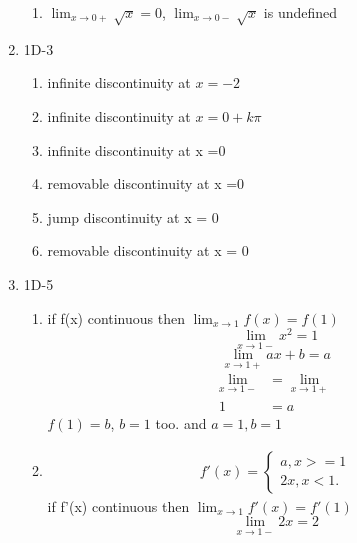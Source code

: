 \documentclass{article}
\begin{document}
\begin{enumerate}
    \begin{enumerate}
        \item 
            $\lim_{x \to 0+} \sqrt{x} = 0$, $\lim_{x \to 0-} \sqrt{x}$ is undefined
    \end{enumerate}
\item 1D-3
    \begin{enumerate}
        \item infinite discontinuity at $x = -2$
        \item infinite discontinuity at $x = 0 + k\pi$
        \item infinite discontinuity at x =0
        \item removable discontinuity at x =0
        \item jump discontinuity at x = 0 
        \item removable discontinuity at x = 0
    \end{enumerate}
\item 1D-5
    \begin{enumerate}
        \item 
            if f(x) continuous then $\lim_{x \to 1} f(x) = f(1)$
            \begin{equation*}
                \lim_{x \to 1-} x^2 = 1
            \end{equation*}
            \begin{equation*}
                \lim_{x \to 1+} ax+b = a
            \end{equation*}
            \begin{align*}
                \lim_{x \to 1-} &= \lim_{x \to 1+} \\
                 1 &= a
            \end{align*}
            $f(1) = b$, $b = 1$ too. and
            $a = 1, b = 1$
        \item 
            \begin{align*} f'(x) =
                \begin{cases}
                    a, x >= 1 \\
                    2x, x<1.
                \end{cases} 
            \end{align*}
            if f'(x) continuous then $\lim_{x \to 1} f'(x) = f'(1)$
            \begin{equation*}
                \lim_{x \to 1-} 2x = 2
            \end{equation*}
            \begin{equation*}

\end{equation*}
\end{enumerate}
\end{enumerate}
\end{document}
